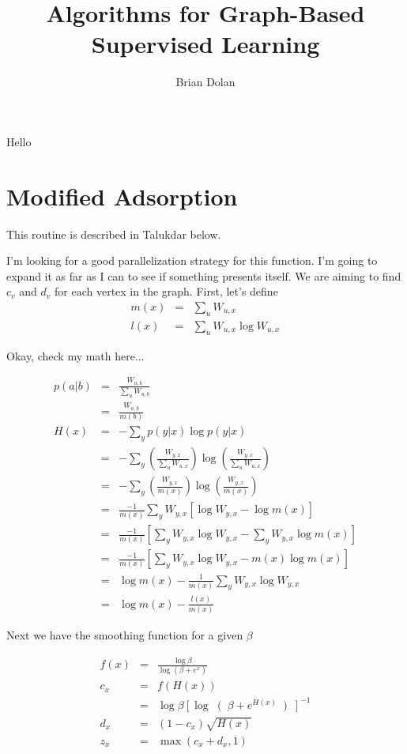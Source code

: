 \documentclass{article}
\begin{document}
\title{Algorithms for Graph-Based Supervised Learning}
\author{Brian Dolan}
\maketitle
Hello

\section{Modified Adsorption}

This routine is described in Talukdar below.

I'm looking for a good parallelization strategy for this function.  I'm going to expand it as far as I can to see if something presents itself.  We are aiming to find $c_v$ and $d_v$ for each vertex in the graph.  First, let's define 
\begin{eqnarray}
m(x) &=& \sum_u W_{u,x} \\
l(x) &=& \sum_u W_{u,x} \log W_{u,x}
\end{eqnarray}

Okay, check my math here...

\begin{eqnarray}
p(a|b) &=& \frac{W_{a,b}}{\sum_u W_{u,b}} \\
  &=& \frac{W_{a,b}}{m(b)} \\
H(x) &=& -\sum_y p(y|x) \log p(y|x) \\
&=& -\sum _y \left( \frac{W_{y,x}} {\sum_u W_{u,x} } \right) \log \left(  \frac{W_{y,x}}{\sum_u W_{u,x} } \right) \\
&=& -\sum _y \left( \frac{W_{y,x}} {m(x) } \right) \log \left(  \frac{W_{y,x}}{m(x) } \right) \\
&=& \frac{-1}{m(x)} \sum_y W_{y,x} \left[ \log W_{y,x} - \log m(x) \right] \\
&=& \frac{-1}{m(x)} \left[ \sum_y W_{y,x} \log W_{y,x} -  \sum_y W_{y,x} \log m(x) \right] \\
&=& \frac{-1}{m(x)} \left[ \sum_y W_{y,x} \log W_{y,x} - m(x) \log m(x) \right] \\
&=& \log m(x) -  \frac{1}{m(x)}\sum_y W_{y,x} \log W_{y,x} \\
&=& \log m(x) - \frac{l(x)}{m(x)}
\end{eqnarray}

Next we have the smoothing function for a given $\beta$

\begin{eqnarray}
f(x) &=& \frac{\log \beta}{\log(\beta + e^{x})} \\ 
c_x &=& f(H(x)) \\
&=& \log \beta \left[ \log \right( \beta + e^{H(x)} \left)\right]^{-1} \\
d_x &=& (1-c_x) \sqrt{H(x)} \\
z_x &=& \max( c_x + d_x, 1)
\end{eqnarray}
\end{document}
